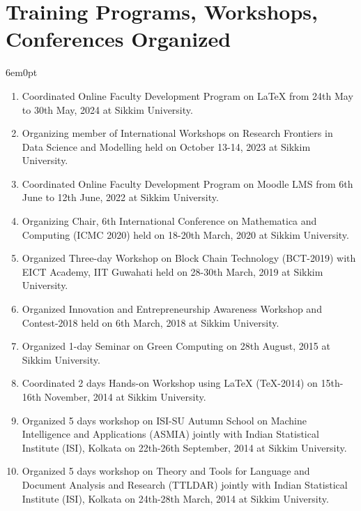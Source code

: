 \documentclass[11pt,a4paper]{moderncv}
\begin{document}
\section{\textbf{Training Programs, Workshops, Conferences Organized}}

\begin{adjustwidth}{6em}{0pt}
	\begin{enumerate}
		
	
		\item Coordinated Online Faculty Development Program on LaTeX from 24th May to 30th May, 2024 at Sikkim University.
		
		\item Organizing member of International Workshops on Research Frontiers in Data Science and Modelling held on October 13-14, 2023 at Sikkim University.
		
		\item Coordinated Online Faculty Development Program on Moodle LMS from 6th June to 12th June, 2022 at Sikkim University.
		
		\item Organizing Chair, 6th International Conference on Mathematica and Computing (ICMC 2020) held on 18-20th March, 2020 at Sikkim University.
		
		\item Organized Three-day Workshop on Block Chain Technology (BCT-2019) with EICT Academy, IIT Guwahati held on 28-30th March, 2019 at Sikkim University.
		
		\item Organized Innovation and Entrepreneurship Awareness Workshop and Contest-2018 held on 6th March, 2018 at Sikkim University.
		
		\item Organized 1-day Seminar on Green Computing on 28th August, 2015 at Sikkim University.
		
		\item Coordinated 2 days Hands-on Workshop using LaTeX (TeX-2014) on 15th-16th November, 2014 at Sikkim University.
		
		\item Organized 5 days workshop on ISI-SU Autumn School on Machine Intelligence and Applications (ASMIA) jointly with Indian Statistical Institute (ISI), Kolkata on 22th-26th September, 2014 at Sikkim University.
		
		\item Organized 5 days workshop on Theory and Tools for Language and Document Analysis and Research (TTLDAR) jointly with Indian Statistical Institute (ISI), Kolkata on 24th-28th March, 2014 at Sikkim University.
		
	\end{enumerate}
\end{adjustwidth}
\end{document}
